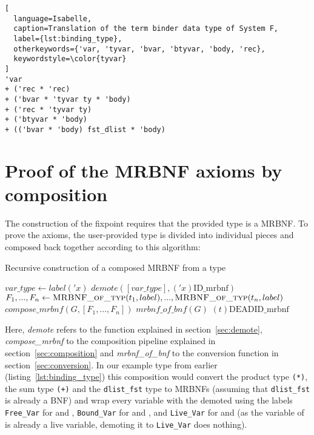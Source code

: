 \begin{lstlisting}[
  language=Isabelle,
  caption=Translation of the term binder data type of System F,
  label={lst:binding_type},
  otherkeywords={'var, 'tyvar, 'bvar, 'btyvar, 'body, 'rec},
  keywordstyle=\color{tyvar}
]
'var
+ ('rec * 'rec)
+ ('bvar * 'tyvar ty * 'body)
+ ('rec * 'tyvar ty)
+ ('btyvar * 'body)
+ (('bvar * 'body) fst_dlist * 'body)
\end{lstlisting}

\section{Proof of the \ac{MRBNF} axioms by composition}\label{sec:mrbnf_of_typ}

The construction of the fixpoint requires that the provided type is a \ac{MRBNF}. To prove the axioms, the user-provided type is divided into individual pieces and composed back together according to this algorithm:

\begin{algorithm}
\caption{Recursive construction of a composed \ac{MRBNF} from a type}\label{alg:mrbnf_of_typ}
\begin{algorithmic}[1]
    \State $\textit{var\_type}\gets label('x)$ \Comment{\textcolor{darkgreen}{is $'x$ Live, Free, Bound or Dead?}}
    \State \Return $\textit{demote}([\textit{var\_type}], ('x)\text{ID\_mrbnf})$
    \State $F_1,...,F_n\gets \Call{MRBNF\_of\_typ}{t_1, label},...,\Call{MRBNF\_of\_typ}{t_n, label}$
    \State \Return $\textit{compose\_mrbnf}(G, [F_1,...,F_n])$
    \State $\textit{mrbnf\_of\_bnf}(G)$ \Comment{\textcolor{darkgreen}{Convert G to a MRBNF and register it for future use}}
    \State \Return {}
  \Else
    \State \Return $(t)\text{DEADID\_mrbnf}$
  \EndIf
\EndFunction
\end{algorithmic}
\end{algorithm}

Here, \textit{demote} refers to the function explained in section~\ref{sec:demote}, \textit{compose\_mrbnf} to the composition pipeline explained in section~\ref{sec:composition} and \textit{mrbnf\_of\_bnf} to the conversion function in section~\ref{sec:conversion}. In our example type from earlier (listing~\ref{lst:binding_type}) this composition would convert the product type \texttt{(*)}, the sum type \texttt{(+)} and the \texttt{dlist\_fst} type to \acp{MRBNF} (assuming that \texttt{dlist\_fst} is already a \ac{BNF}) and wrap every variable with the  demoted using the labels \texttt{Free\_Var} for  and , \texttt{Bound\_Var} for  and , and \texttt{Live\_Var} for  and  (as the variable of  is already a live variable, demoting it to \texttt{Live\_Var} does nothing).

